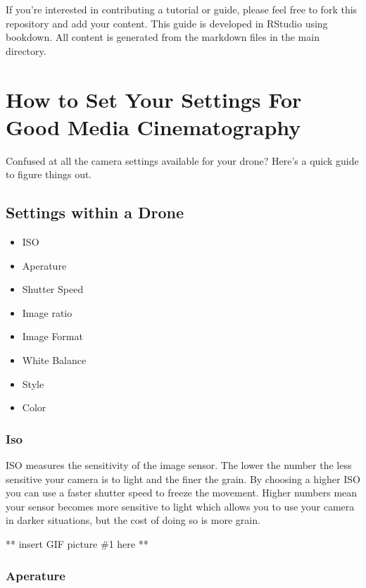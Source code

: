 \documentclass[
]{book}
\providecommand{\tightlist}{%
  \setlength{\itemsep}{0pt}\setlength{\parskip}{0pt}}
\begin{document}
If you're interested in contributing a tutorial or guide, please feel free to fork this repository and add your content. This guide is developed in RStudio using bookdown. All content is generated from the markdown files in the main directory.

\hypertarget{ch-camera-settings}{%
\chapter{How to Set Your Settings For Good Media Cinematography}\label{ch-camera-settings}}

Confused at all the camera settings available for your drone? Here's a quick guide to figure things out.

\hypertarget{settings-within-a-drone}{%
\section{Settings within a Drone}\label{settings-within-a-drone}}

\begin{itemize}
\tightlist
\item
  ISO
\item
  Aperature
\item
  Shutter Speed
\item
  Image ratio
\item
  Image Format
\item
  White Balance
\item
  Style
\item
  Color
\end{itemize}

\hypertarget{iso}{%
\subsection{Iso}\label{iso}}

ISO measures the sensitivity of the image sensor. The lower the number the less sensitive your camera is to light and the finer the grain. By choosing a higher ISO you can use a faster shutter speed to freeze the movement. Higher numbers mean your sensor becomes more sensitive to light which allows you to use your camera in darker situations, but the cost of doing so is more grain.

** insert GIF picture \#1 here **

\hypertarget{aperature}{%
\subsection{Aperature}\label{aperature}}
\end{document}

